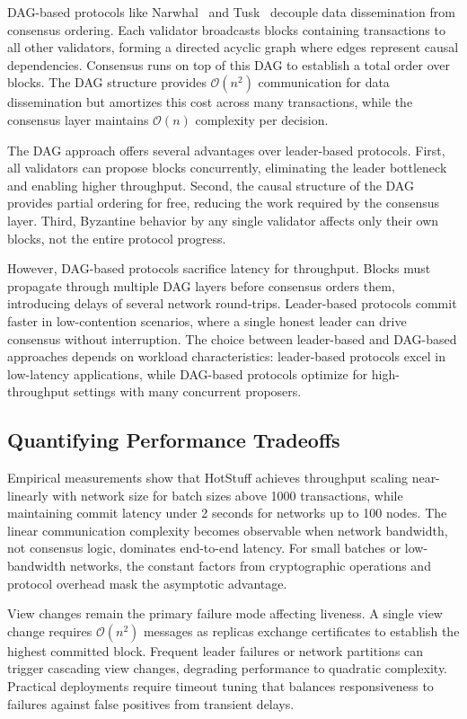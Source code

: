 DAG-based protocols like Narwhal~\cite{danezis2022narwhal} and Tusk~\cite{danezis2022narwhal} decouple data dissemination from consensus ordering. Each validator broadcasts blocks containing transactions to all other validators, forming a directed acyclic graph where edges represent causal dependencies. Consensus runs on top of this DAG to establish a total order over blocks. The DAG structure provides $\mathcal{O}(n^2)$ communication for data dissemination but amortizes this cost across many transactions, while the consensus layer maintains $\mathcal{O}(n)$ complexity per decision.

The DAG approach offers several advantages over leader-based protocols. First, all validators can propose blocks concurrently, eliminating the leader bottleneck and enabling higher throughput. Second, the causal structure of the DAG provides partial ordering for free, reducing the work required by the consensus layer. Third, Byzantine behavior by any single validator affects only their own blocks, not the entire protocol progress.

However, DAG-based protocols sacrifice latency for throughput. Blocks must propagate through multiple DAG layers before consensus orders them, introducing delays of several network round-trips. Leader-based protocols commit faster in low-contention scenarios, where a single honest leader can drive consensus without interruption. The choice between leader-based and DAG-based approaches depends on workload characteristics: leader-based protocols excel in low-latency applications, while DAG-based protocols optimize for high-throughput settings with many concurrent proposers.

\subsection{Quantifying Performance Tradeoffs}

Empirical measurements show that HotStuff achieves throughput scaling near-linearly with network size for batch sizes above 1000 transactions, while maintaining commit latency under 2 seconds for networks up to 100 nodes. The linear communication complexity becomes observable when network bandwidth, not consensus logic, dominates end-to-end latency. For small batches or low-bandwidth networks, the constant factors from cryptographic operations and protocol overhead mask the asymptotic advantage.

View changes remain the primary failure mode affecting liveness. A single view change requires $\mathcal{O}(n^2)$ messages as replicas exchange certificates to establish the highest committed block. Frequent leader failures or network partitions can trigger cascading view changes, degrading performance to quadratic complexity. Practical deployments require timeout tuning that balances responsiveness to failures against false positives from transient delays.

